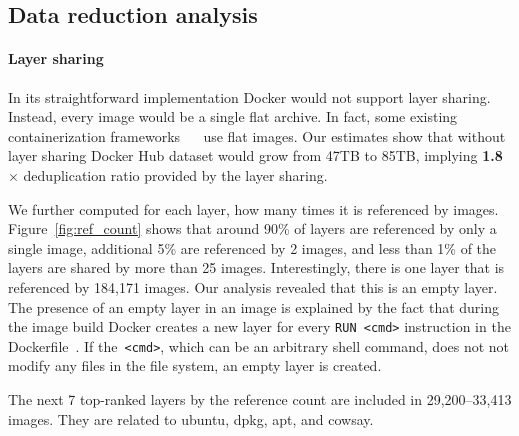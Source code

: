 \subsection{Data reduction analysis} 
\label{sec:dedup_ratio}

\paragraph{Layer sharing}

In its  straightforward implementation Docker would not support layer sharing.
%
Instead, every image would be a single flat archive.
%
In fact, some existing containerization frameworks
~\cite{singularity}~\cite{openvz} 
%
use flat images.
%
Our estimates show that without layer sharing Docker Hub dataset would grow
from 47TB to 85TB, implying \textbf{1.8$\times$} deduplication ratio provided
by the layer sharing.
 
We further computed for each layer, how many times it is referenced by images.
%
Figure~\ref{fig:ref_count} shows that around 90\% of layers are referenced by
only a single image, additional 5\% are referenced by 2 images, and less than
1\% of the layers are shared by more than 25 images.
%
Interestingly, there is one layer that is referenced by 184,171 images.  Our
analysis revealed that this is an empty layer.
%
The presence of an empty layer in an image is explained
by the fact that during the image build Docker creates a new layer
for every \texttt{RUN <cmd>} instruction
in the Dockerfile~\VT{~\cite{}}.
%
If the~\texttt{<cmd>}, which can be an arbitrary shell command,
does not not modify any files in the file system,
an empty layer is created.
%

The next 7 top-ranked layers by the reference count
are included in 29,200--33,413 images.
They are related to ubuntu, dpkg, apt, and cowsay.
%
%
%

